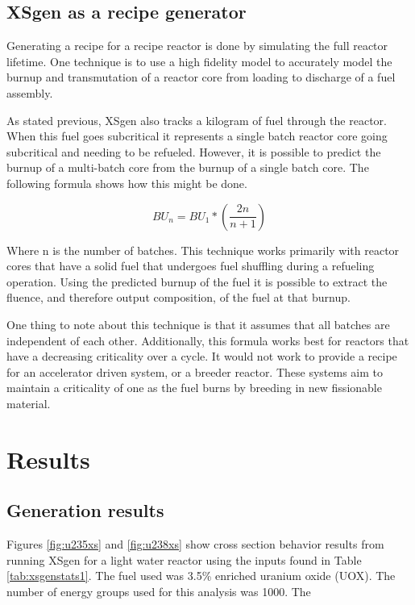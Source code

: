 \documentclass{article}
\begin{document}
\subsection{XSgen as a recipe generator}
Generating a recipe for a recipe reactor is done by simulating the full reactor lifetime. One technique is to use a high fidelity model to accurately model the burnup and transmutation of a reactor core from loading to discharge of a fuel assembly. 

As stated previous, XSgen also tracks a kilogram of fuel through the reactor. When this fuel goes subcritical it represents a single batch reactor core going subcritical and needing to be refueled. However, it is possible to predict the burnup of a multi-batch core from the burnup of a single batch core. The following formula shows how this might be done. 

$$ BU_n = BU_1 * (\frac{2n}{n+1}) $$

Where n is the number of batches. This technique works primarily with reactor cores that have a solid fuel that undergoes fuel shuffling during a refueling operation. Using the predicted burnup of the fuel it is possible to extract the fluence, and therefore output composition, of the fuel at that burnup. 

One thing to note about this technique is that it assumes that all batches are independent of each other. Additionally, this formula works best for reactors that have a decreasing criticality over a cycle. It would not work to provide a recipe for an accelerator driven system, or a breeder reactor. These systems aim to maintain a criticality of one as the fuel burns by breeding in new fissionable material. 

\section{Results}
\subsection{Generation results}
Figures \ref{fig:u235xs} and \ref{fig:u238xs} show cross section behavior results from running XSgen for a light water reactor using the inputs found in Table \ref{tab:xsgenstats1}. The fuel used was 3.5\% enriched uranium oxide (UOX). The number of energy groups used for this analysis was 1000. The 
\end{document}
